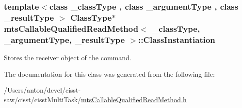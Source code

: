 \subsubsection[{Class\+Instantiation}]{\setlength{\rightskip}{0pt plus 5cm}template$<$class \+\_\+class\+Type , class \+\_\+argument\+Type , class \+\_\+result\+Type $>$ {\bf Class\+Type}$\ast$ {\bf mts\+Callable\+Qualified\+Read\+Method}$<$ \+\_\+class\+Type, \+\_\+argument\+Type, \+\_\+result\+Type $>$\+::Class\+Instantiation\hspace{0.3cm}{\ttfamily [protected]}}\label{classmts_callable_qualified_read_method_ae3b6667da77471acabf410afa3a541d1}
Stores the receiver object of the command. 

The documentation for this class was generated from the following file\+:\begin{DoxyCompactItemize}
\item 
/\+Users/anton/devel/cisst-\/saw/cisst/cisst\+Multi\+Task/\hyperlink{mts_callable_qualified_read_method_8h}{mts\+Callable\+Qualified\+Read\+Method.\+h}\end{DoxyCompactItemize}
